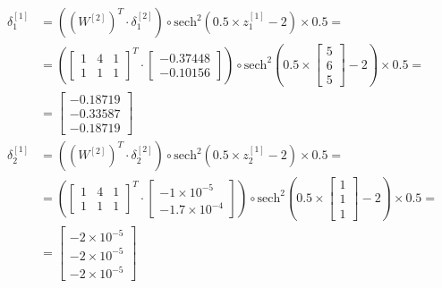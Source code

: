 \documentclass[12pt]{article}
\begin{document}
\begin{enumerate}[leftmargin=\labelsep]
        \begingroup
        \allowdisplaybreaks
        \begin{align*}
          \delta^{[1]}_1 & = \left(\left(W^{[2]}\right)^{T} \cdot \delta^{[2]}_1\right) \circ \text{sech}^{2}\left(0.5 \times z^{[1]}_1 - 2\right) \times 0.5 =                                                                                                                        \\
                         & = \left(\begin{bmatrix} 1 & 4 & 1 \\ 1 & 1 & 1 \end{bmatrix}^{T} \cdot \begin{bmatrix} -0.37448 \\ -0.10156 \end{bmatrix}\right) \circ \text{sech}^{2}\left(0.5 \times \begin{bmatrix}  5 \\ 6 \\ 5 \end{bmatrix} - 2\right) \times 0.5 =                   \\
                         & = \begin{bmatrix} -0.18719 \\ -0.33587 \\ -0.18719\end{bmatrix}                                                                                                                                                                                             \\
          \delta^{[1]}_2 & = \left(\left(W^{[2]}\right)^{T} \cdot \delta^{[2]}_2\right) \circ  \text{sech}^{2}\left(0.5\times z^{[1]}_2 - 2\right) \times 0.5 =                                                                                                                        \\
                         & = \left(\begin{bmatrix} 1 & 4 & 1 \\ 1 & 1 & 1 \end{bmatrix}^{T} \cdot \begin{bmatrix} -1 \times 10^{-5} \\ -1.7 \times 10^{-4} \end{bmatrix}\right) \circ \text{sech}^{2}\left(0.5\times\begin{bmatrix}  1 \\ 1 \\ 1 \end{bmatrix} - 2\right) \times 0.5 = \\
                         & = \begin{bmatrix} -2 \times 10^{-5} \\ -2 \times 10^{-5} \\ -2 \times 10^{-5}\end{bmatrix}
        \end{align*}
        \endgroup


\end{enumerate}
\end{document}
